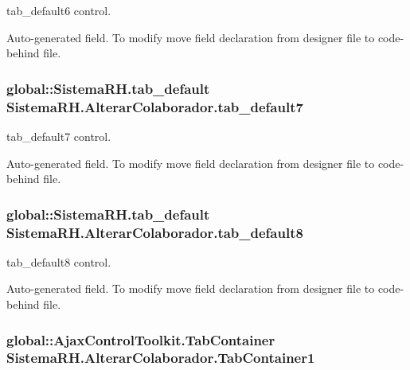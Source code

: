tab\_\-default6 control. 

Auto-\/generated field. To modify move field declaration from designer file to code-\/behind file. \hypertarget{class_sistema_r_h_1_1_alterar_colaborador_ab13ac02b44160a0263bbaa03b37cdf7e}{
\subsubsection[{tab\_\-default7}]{\setlength{\rightskip}{0pt plus 5cm}global::SistemaRH.tab\_\-default {\bf SistemaRH.AlterarColaborador.tab\_\-default7}}}
\label{class_sistema_r_h_1_1_alterar_colaborador_ab13ac02b44160a0263bbaa03b37cdf7e}


tab\_\-default7 control. 

Auto-\/generated field. To modify move field declaration from designer file to code-\/behind file. \hypertarget{class_sistema_r_h_1_1_alterar_colaborador_a1947e68420d9edf6af8992501242be2a}{
\subsubsection[{tab\_\-default8}]{\setlength{\rightskip}{0pt plus 5cm}global::SistemaRH.tab\_\-default {\bf SistemaRH.AlterarColaborador.tab\_\-default8}}}
\label{class_sistema_r_h_1_1_alterar_colaborador_a1947e68420d9edf6af8992501242be2a}


tab\_\-default8 control. 

Auto-\/generated field. To modify move field declaration from designer file to code-\/behind file. \hypertarget{class_sistema_r_h_1_1_alterar_colaborador_a1640c5524259d0cb5ac6faa904a86441}{
\subsubsection[{TabContainer1}]{\setlength{\rightskip}{0pt plus 5cm}global::AjaxControlToolkit.TabContainer {\bf SistemaRH.AlterarColaborador.TabContainer1}}}
\label{class_sistema_r_h_1_1_alterar_colaborador_a1640c5524259d0cb5ac6faa904a86441}


